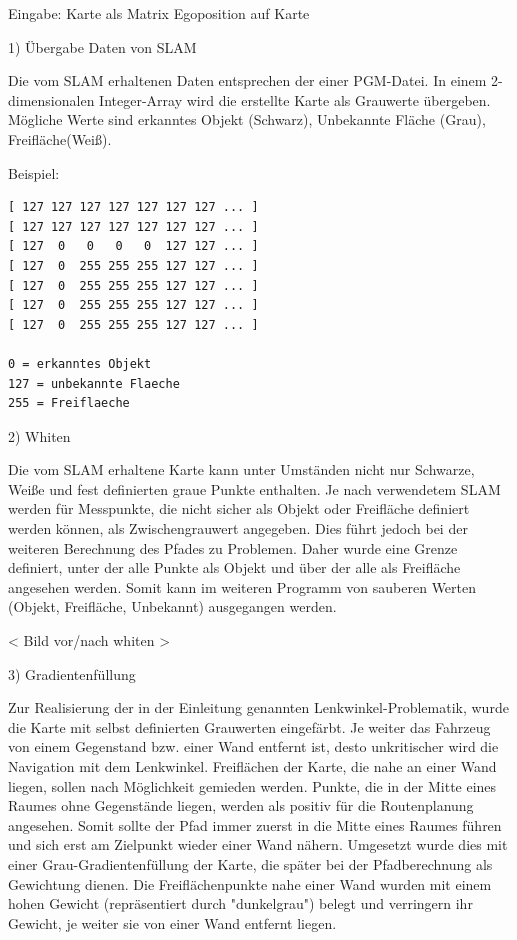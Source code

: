 Eingabe: 
Karte als Matrix
Egoposition auf Karte


1) Übergabe Daten von SLAM

Die vom SLAM erhaltenen Daten entsprechen der einer PGM-Datei. In einem 2-dimensionalen Integer-Array wird die erstellte Karte als Grauwerte übergeben. Mögliche Werte sind 
erkanntes Objekt (Schwarz),  Unbekannte Fläche (Grau),  Freifläche(Weiß).


Beispiel: 
\begin{lstlisting}
[ 127 127 127 127 127 127 127 ... ]
[ 127 127 127 127 127 127 127 ... ]
[ 127  0   0   0   0  127 127 ... ]
[ 127  0  255 255 255 127 127 ... ]
[ 127  0  255 255 255 127 127 ... ]
[ 127  0  255 255 255 127 127 ... ]
[ 127  0  255 255 255 127 127 ... ]

0 = erkanntes Objekt
127 = unbekannte Flaeche
255 = Freiflaeche

\end{lstlisting}

2) Whiten

Die vom SLAM erhaltene Karte kann unter Umständen nicht nur Schwarze, Weiße und fest definierten graue Punkte enthalten. Je nach verwendetem SLAM werden für Messpunkte, die nicht sicher als Objekt oder Freifläche definiert werden können, als Zwischengrauwert angegeben. Dies führt jedoch bei der weiteren Berechnung des Pfades zu Problemen. Daher wurde eine Grenze definiert, unter der alle Punkte als Objekt und über der alle als Freifläche angesehen werden. Somit kann im weiteren Programm von sauberen Werten (Objekt, Freifläche, Unbekannt) ausgegangen werden. 

< Bild vor/nach whiten >


3) Gradientenfüllung

Zur Realisierung der in der Einleitung genannten Lenkwinkel-Problematik, wurde die Karte mit selbst definierten Grauwerten eingefärbt. Je weiter das Fahrzeug von einem Gegenstand bzw. einer Wand entfernt ist, desto unkritischer wird die Navigation mit dem Lenkwinkel. 
Freiflächen der Karte, die nahe an einer Wand liegen, sollen nach Möglichkeit gemieden werden. Punkte, die in der Mitte eines Raumes ohne Gegenstände liegen, werden als positiv für die Routenplanung angesehen. 
Somit sollte der Pfad immer zuerst in die Mitte eines Raumes führen und sich erst am Zielpunkt wieder einer Wand nähern. 
Umgesetzt wurde dies mit einer Grau-Gradientenfüllung der Karte, die später bei der Pfadberechnung als Gewichtung dienen. Die Freiflächenpunkte nahe einer Wand wurden mit einem hohen Gewicht (repräsentiert durch "dunkelgrau") belegt und verringern ihr Gewicht, je weiter sie von einer Wand entfernt liegen. 

